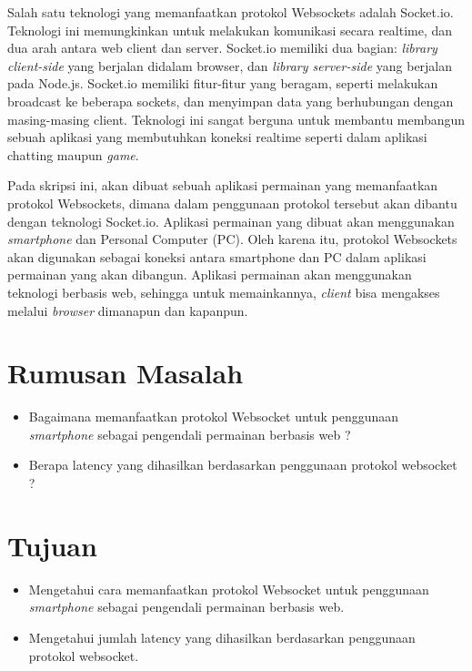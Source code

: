 \documentclass[a4paper,twoside]{article}
\begin{document}
Salah satu teknologi yang memanfaatkan protokol Websockets adalah Socket.io. Teknologi ini memungkinkan untuk melakukan komunikasi secara realtime, dan dua arah antara web client dan server. Socket.io memiliki dua bagian: \textit{library client-side} yang berjalan didalam browser, dan \textit{library server-side} yang berjalan pada Node.js. Socket.io memiliki fitur-fitur yang beragam, seperti melakukan broadcast ke beberapa sockets, dan menyimpan data yang berhubungan dengan masing-masing client. Teknologi ini sangat berguna untuk membantu membangun sebuah aplikasi yang membutuhkan koneksi realtime seperti dalam aplikasi chatting maupun \textit{game}.

Pada skripsi ini, akan dibuat sebuah aplikasi permainan yang memanfaatkan protokol Websockets, dimana dalam penggunaan protokol tersebut akan dibantu dengan teknologi Socket.io. Aplikasi permainan yang dibuat akan menggunakan \textit{smartphone} dan Personal Computer (PC). Oleh karena itu, protokol Websockets akan digunakan sebagai koneksi antara smartphone dan PC dalam aplikasi permainan yang akan dibangun. Aplikasi permainan akan menggunakan teknologi berbasis web, sehingga untuk memainkannya, \textit{client} bisa mengakses melalui \textit{browser} dimanapun dan kapanpun.

\section{Rumusan Masalah}
\begin{itemize}
	\item Bagaimana memanfaatkan protokol Websocket untuk penggunaan \textit{smartphone} sebagai pengendali permainan berbasis web ?
	\item Berapa latency yang dihasilkan berdasarkan penggunaan protokol websocket ? 
\end{itemize}

\section{Tujuan}
\begin{itemize}
	\item Mengetahui cara memanfaatkan protokol Websocket untuk penggunaan \textit{smartphone} sebagai pengendali permainan berbasis web.
	\item Mengetahui jumlah latency yang dihasilkan berdasarkan penggunaan protokol websocket.
\end{itemize}
\end{document}
